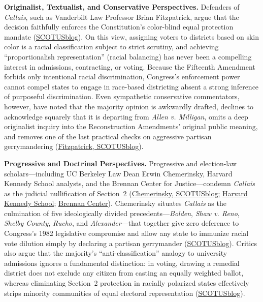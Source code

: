 \documentclass[12pt]{article}
\begin{document}
\textbf{Originalist, Textualist, and Conservative Perspectives.} Defenders of \textit{Callais}, such as Vanderbilt Law Professor Brian Fitzpatrick, argue that the decision faithfully enforces the Constitution's color-blind equal protection mandate (\href{https://www.scotusblog.com/2026/07/the-case-for-callais/}{SCOTUSblog}). On this view, assigning voters to districts based on skin color is a racial classification subject to strict scrutiny, and achieving ``proportionalish representation'' (racial balancing) has never been a compelling interest in admissions, contracting, or voting. Because the Fifteenth Amendment forbids only intentional racial discrimination, Congress's enforcement power cannot compel states to engage in race-based districting absent a strong inference of purposeful discrimination. Even sympathetic conservative commentators, however, have noted that the majority opinion is awkwardly drafted, declines to acknowledge squarely that it is departing from \textit{Allen v. Milligan}, omits a deep originalist inquiry into the Reconstruction Amendments' original public meaning, and removes one of the last practical checks on aggressive partisan gerrymandering (\href{https://www.scotusblog.com/2026/07/the-case-for-callais/}{Fitzpatrick, SCOTUSblog}).

\textbf{Progressive and Doctrinal Perspectives.} Progressive and election-law scholars---including UC Berkeley Law Dean Erwin Chemerinsky, Harvard Kennedy School analysts, and the Brennan Center for Justice---condemn \textit{Callais} as the judicial nullification of Section~2 (\href{https://www.scotusblog.com/2026/05/understanding-the-recent-voting-rights-act-case/}{Chemerinsky, SCOTUSblog}; \href{https://www.hks.harvard.edu/faculty-research/policy-topics/fairness-justice/what-louisiana-v-callais-means-voting-rights-act}{Harvard Kennedy School}; \href{https://www.brennancenter.org/our-work/analysis-opinion/after-louisiana-v-callais-heres-proof-just-how-bad-voting-rights-america}{Brennan Center}). Chemerinsky situates \textit{Callais} as the culmination of five ideologically divided precedents---\textit{Bolden}, \textit{Shaw v. Reno}, \textit{Shelby County}, \textit{Rucho}, and \textit{Alexander}---that together give zero deference to Congress's 1982 legislative compromise and allow any state to immunize racial vote dilution simply by declaring a partisan gerrymander (\href{https://www.scotusblog.com/2026/05/understanding-the-recent-voting-rights-act-case/}{SCOTUSblog}). Critics also argue that the majority's ``anti-classification'' analogy to university admissions ignores a fundamental distinction: in voting, drawing a remedial district does not exclude any citizen from casting an equally weighted ballot, whereas eliminating Section~2 protection in racially polarized states effectively strips minority communities of equal electoral representation (\href{https://www.scotusblog.com/2026/05/understanding-the-recent-voting-rights-act-case/}{SCOTUSblog}).
\end{document}

